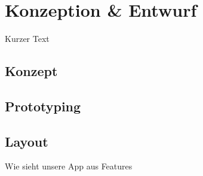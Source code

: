 \chapter{Konzeption \& Entwurf}
\label{cha:konzeption}
Kurzer Text

\section{Konzept}
\label{sec:konzeption:konzept}

\section{Prototyping}
\label{sec:konzeption:prototyping}

\section{Layout}
\label{sec:konzeption:layout}
Wie sieht unsere App aus
Features